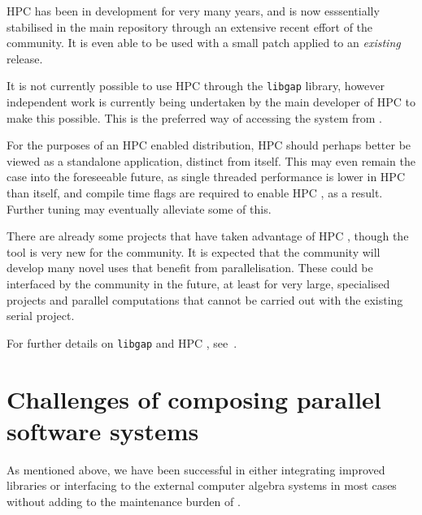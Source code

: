 \documentclass{deliverablereport}
\begin{document}
HPC \GAP has been in development for very many years, and is now esssentially stabilised in the
main \GAP repository through an extensive recent effort of the \GAP community. It is
even able to be used with a small patch applied to an \emph{existing} \GAP release.

It is not currently possible to use HPC \GAP through the \texttt{libgap} library, however
independent work is currently being undertaken by the main developer of HPC \GAP to make this
possible. This is the preferred way of accessing the \GAP system from \SageMath.

For the purposes of an HPC enabled \Sage distribution, HPC \GAP should perhaps better be viewed as a
standalone application, distinct from \GAP itself. This may even remain the case into the
foreseeable future, as single threaded performance is lower in HPC \GAP than \GAP itself, and compile
time flags are required to enable HPC \GAP, as a result. Further tuning may eventually alleviate some
of this.

There are already some \GAP projects that have taken advantage of HPC \GAP, though the
tool is very new for the \GAP community. It is expected that the \GAP community will develop
many novel uses that benefit from parallelisation. These could be interfaced by the \SageMath
community in the future, at least for very large, specialised projects and parallel computations
that cannot be carried out with the existing serial project.

For further details on \texttt{libgap} and HPC \GAP, see~.

\section{Challenges of composing parallel software systems}

As mentioned above, we have been successful in either integrating improved libraries
or interfacing to the external computer algebra systems in most cases without adding to
the maintenance burden of \SageMath.
\end{document}

